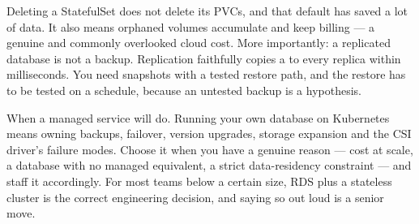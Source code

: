 \begin{drtip}
Deleting a StatefulSet does not delete its PVCs, and that default has saved a lot of data. It also means orphaned volumes accumulate and keep billing --- a genuine and commonly overlooked cloud cost. More importantly: a replicated database is not a backup. Replication faithfully copies a  to every replica within milliseconds. You need snapshots with a tested restore path, and the restore has to be tested on a schedule, because an untested backup is a hypothesis.
\end{drtip}

 When a managed service will do. Running your own database on Kubernetes means owning backups, failover, version upgrades, storage expansion and the CSI driver's failure modes. Choose it when you have a genuine reason --- cost at scale, a database with no managed equivalent, a strict data-residency constraint --- and staff it accordingly. For most teams below a certain size, RDS plus a stateless cluster is the correct engineering decision, and saying so out loud is a senior move.

